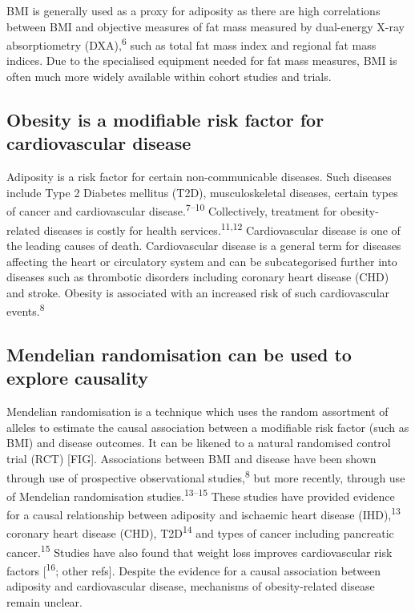 \documentclass[11pt,twoside]{bristolthesis}
\begin{document}
BMI is generally used as a proxy for adiposity as there are high correlations between BMI and objective measures of fat mass measured by dual-energy X-ray absorptiometry (DXA),\textsuperscript{6} such as total fat mass index and regional fat mass indices. Due to the specialised equipment needed for fat mass measures, BMI is often much more widely available within cohort studies and trials.

\hypertarget{obesity-is-a-modifiable-risk-factor-for-cardiovascular-disease}{%
\subsection{Obesity is a modifiable risk factor for cardiovascular disease}\label{obesity-is-a-modifiable-risk-factor-for-cardiovascular-disease}}

Adiposity is a risk factor for certain non-communicable diseases. Such diseases include Type 2 Diabetes mellitus (T2D), musculoskeletal diseases, certain types of cancer and cardiovascular disease.\textsuperscript{7--10} Collectively, treatment for obesity-related diseases is costly for health services.\textsuperscript{11,12} Cardiovascular disease is one of the leading causes of death. Cardiovascular disease is a general term for diseases affecting the heart or circulatory system and can be subcategorised further into diseases such as thrombotic disorders including coronary heart disease (CHD) and stroke. Obesity is associated with an increased risk of such cardiovascular events.\textsuperscript{8}

\hypertarget{mendelian-randomisation-can-be-used-to-explore-causality}{%
\subsection{Mendelian randomisation can be used to explore causality}\label{mendelian-randomisation-can-be-used-to-explore-causality}}

Mendelian randomisation is a technique which uses the random assortment of alleles to estimate the causal association between a modifiable risk factor (such as BMI) and disease outcomes. It can be likened to a natural randomised control trial (RCT) {[}FIG{]}. Associations between BMI and disease have been shown through use of prospective observational studies,\textsuperscript{8} but more recently, through use of Mendelian randomisation studies.\textsuperscript{13--15} These studies have provided evidence for a causal relationship between adiposity and ischaemic heart disease (IHD),\textsuperscript{13} coronary heart disease (CHD), T2D\textsuperscript{14} and types of cancer including pancreatic cancer.\textsuperscript{15} Studies have also found that weight loss improves cardiovascular risk factors {[}\textsuperscript{16}; other refs{]}. Despite the evidence for a causal association between adiposity and cardiovascular disease, mechanisms of obesity-related disease remain unclear.
\end{document}
